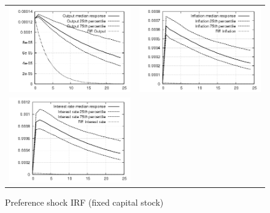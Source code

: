 \documentclass{beamer}
\begin{document}
\frame
{
\begin{figure}[ht]
\caption{Preference shock IRF (fixed capital stock)}
\begin{center}
\begin{tabular}{cc}
\includegraphics[scale=0.3]{plots/outputirf_xinok.png} &
\includegraphics[scale=0.3]{plots/inflationirf_xinok.png} \\
\includegraphics[scale=0.3]{plots/interestirf_xinok.png} \\
\end{tabular}
\end{center}
\end{figure}
}
\end{document}
